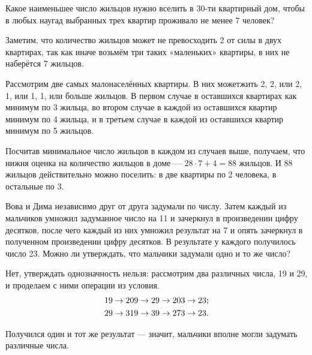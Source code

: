 
\begin{itemize}

	\itA Какое наименьшее число жильцов нужно вселить в 30-ти квартирный дом, чтобы в любых наугад выбранных трех квартир проживало не менее 7 человек?
	
	\itr Заметим, что количество жильцов может не превосходить 2 от силы в двух квартирах, так как иначе возьмём три таких «маленьких» квартиры, в них не наберётся 7 жильцов.
	
	Рассмотрим две самых малонаселённых квартиры. В них может\linebreak жить 2, 2, или 2, 1, или 1, 1, или больше жильцов. В первом случае в оставшихся квартирах как минимум по 3 жильца, во втором случае в каждой из оставшихся квартир минимум по 4 жильца, и в третьем случае в каждой из оставшихся квартир минимум по 5 жильцов. 
	
	Посчитав минимальное число жильцов в каждом из случаев выше, получаем, что нижня оценка на количество жильцов в доме — $28 \cdot 7 + 4 = 88$ жильцов. И 88 жильцов действительно можно поселить: в две квартиры по 2 человека, в остальные по 3.

	\itB Вова и Дима независимо друг от друга задумали по числу. Затем каждый из мальчиков умножил задуманное число на 11 и зачеркнул в произведении цифру десятков, после чего каждый из них умножил результат на 7 и опять зачеркнул в полученном произведении цифру десятков. В результате у каждого получилось число 23. Можно ли утверждать, что мальчики задумали одно и то же число?
	
	\itr Нет, утверждать однозначность нельзя: рассмотрим два различных числа, 19 и 29, и проделаем с ними операции из условия.
\begin{align*}
	& 19 \rightarrow 209 \rightarrow  29 \rightarrow 203 \rightarrow 23\scolon \\
	& 29 \rightarrow 319 \rightarrow 39 \rightarrow 273 \rightarrow 23.
\end{align*}

	Получился один и тот же результат — значит, мальчики вполне могли задумать различные числа.

\end{itemize}


